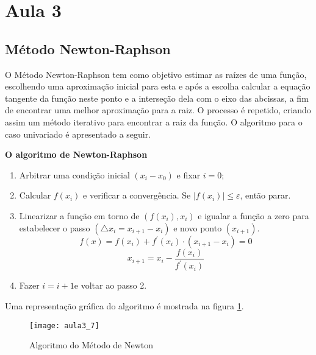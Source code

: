 \section{Aula 3}

\subsection{Método Newton-Raphson}
O Método Newton-Raphson tem como objetivo estimar as raízes de uma
função, escolhendo uma aproximação inicial para esta e após a escolha
calcular a equação tangente da função neste ponto e a interseção dela
com o eixo das abcissas, a fim de encontrar uma melhor aproximação
para a raiz. O processo é repetido, criando assim um método iterativo
para encontrar a raiz da função. O algoritmo para o caso univariado é apresentado a seguir.


\begin{framed} %
    \textbf{O algoritmo de Newton-Raphson}
    
    \begin{enumerate}
    \item Arbitrar uma condição inicial $(x_{i}-x_{0})$ e fixar $i=0$;
    
    \item Calcular $f(x_{i})$ e verificar a convergência. Se $|f(x_{i})|\leq \varepsilon$, então parar.
    
    \item Linearizar a função em torno de $(f(x_{i}),x_{i})$ e igualar a função
    a zero para estabelecer o passo $(\triangle x_{i}=x_{i+1}-x_{i})$
    e novo ponto $(x_{i+1})$.
    $$f(x)=f(x_{i})+f^{'}(x_{i})\cdot(x_{i+1}-x_{i})=0$$
    $$x_{i+1}=x_{i}-\frac{f(x_{i})}{f^{'}(x_{i})}$$
    
    \item Fazer $i=i+1$e voltar ao passo 2.
    
    \end{enumerate}
    
    Uma representação  gráfica do algoritmo é mostrada na figura \ref{fig:aula3_7}.
    
\end{framed}

\begin{figure}[H]
\begin{centering}
\texttt{[image: aula3\_7]}\protect\caption{\label{fig:aula3_7} Algoritmo do Método de Newton  }
\end{centering}
\end{figure}

